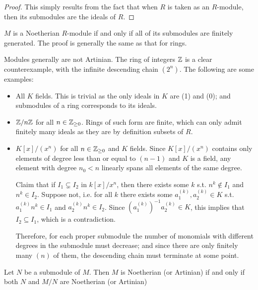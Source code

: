 \begin{proof}
    This simply results from the fact that when $R$ is taken as an $R$-module, then its submodules are the ideals of $R$. 
\end{proof}

\begin{remark}
    $M$ is a Noetherian $R$-module if and only if all of its submodules are finitely generated. The proof is generally the same as that for rings.
\end{remark}

\begin{remark}
    Modules generally are not Artinian. The ring of integers $\mathbb{Z}$ is a clear counterexample, with the infinite descending chain $(2^n)$. The following are some examples:
    \begin{itemize}
        \item All $K$ fields. This is trivial as the only ideals in $K$ are (1) and (0); and submodules of a ring corresponds to its ideals.
        \item $\mathbb{Z}/n\mathbb{Z}$ for all $n\in\mathbb{Z}_{\geq 0}$. Rings of such form are finite, which can only admit finitely many ideals as they are by definition subsets of $R$.
        \item $K[x]/(x^n)$ for all $n\in\mathbb{Z}_{\geq 0}$ and $K$ fields. Since $K[x]/(x^n)$ contains only elements of degree less than or equal to $(n-1)$ and $K$ is a field, any element with degree $n_0 < n$ linearly spans all elements of the same degree. 
        
        Claim that if $I_1\subsetneq I_2$ in $k[x]/x^n$, then there exists some $k$ s.t. $n^k\notin I_1$ and $n^k\in I_2$. Suppose not, i.e. for all $k$ there exists some $a_1^{(k)}, a_2^{(k)}\in K$ s.t. $a_1^{(k)} n^k\in I_1$ and $a_2^{(k)} n^k\in I_2$. Since $(a_1^{(k)})^{-1}a_2^{(k)}\in K$, this implies that $I_2\subseteq I_1$, which is a contradiction.

        Therefore, for each proper submodule the number of monomials with different degrees in the submodule must decrease; and since there are only finitely many $(n)$ of them, the descending chain must terminate at some point. 
    \end{itemize}
\end{remark}

\begin{proposition}\label{thm:Module Noeth iff sub and quot Noeth}
    Let $N$ be a submodule of $M$. Then $M$ is Noetherian (or Artinian) if and only if both $N$ and $M/N$ are Noetherian (or Artinian)
\end{proposition}

